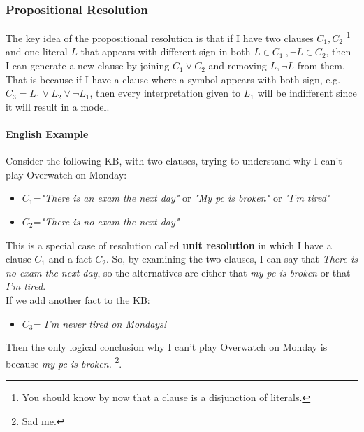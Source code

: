 \documentclass[10pt,a4paper]{article}
\begin{document}
\subsubsection{Propositional Resolution }
\label{subsubsec:prop_resolution}
The key idea of the propositional resolution is that if I have two clauses $C_1,C_2$ \footnote{You should know by now that a clause is a disjunction of literals.} and one literal $L$ that appears with different sign in both $L \in C_1\ ,\neg L \in C_2$, then I can generate a new clause by joining $C_1 \vee C_2$ and removing $L,\neg L$ from them. That is because if I have a clause where a symbol appears with both sign, e.g. $C_3=L_1 \vee L_2 \vee \neg L_1$, then every interpretation given to $L_1$ will be indifferent since it will result in a model. 

\paragraph{English Example} Consider the following KB, with two clauses, trying to understand why I can't play Overwatch on Monday:
\begin{itemize}
\item $C_1$=\textit{"There is an exam the next day"} or \textit{"My pc is broken"} or \textit{"I'm tired"}
\item $C_2$=\textit{"There is no exam the next day"}
\end{itemize}
This is a special case of resolution called \textbf{unit resolution} in which I have a clause $C_1$ and a fact $C_2$. So, by examining the two clauses, I can say that \textit{There is no exam the next day}, so the alternatives are either that \textit{my pc is broken} or that \textit{I'm tired}.\\
If we add another fact to the KB:
\begin{itemize}
\item $C_3$= \textit{I'm never tired on Mondays!}
\end{itemize}
Then the only logical conclusion why I can't play Overwatch on Monday is because \textit{my pc is broken.} \footnote{Sad me.}.
\end{document}
